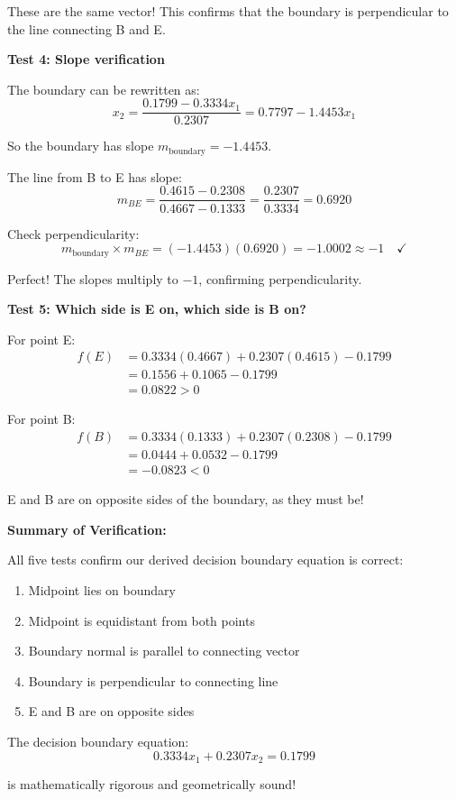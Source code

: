 \documentclass[12pt]{article}
\begin{document}
\begin{computation}
These are the same vector! This confirms that the boundary is perpendicular to the line connecting B and E. \checkmark

\textbf{Test 4: Slope verification}

The boundary can be rewritten as:
\[
x_2 = \frac{0.1799 - 0.3334 x_1}{0.2307} = 0.7797 - 1.4453 x_1
\]

So the boundary has slope \(m_{\text{boundary}} = -1.4453\).

The line from B to E has slope:
\[
m_{BE} = \frac{0.4615 - 0.2308}{0.4667 - 0.1333} = \frac{0.2307}{0.3334} = 0.6920
\]

Check perpendicularity:
\[
m_{\text{boundary}} \times m_{BE} = (-1.4453)(0.6920) = -1.0002 \approx -1 \quad \checkmark
\]

Perfect! The slopes multiply to \(-1\), confirming perpendicularity.

\textbf{Test 5: Which side is E on, which side is B on?}

For point E:
\begin{align*}
f(E) &= 0.3334(0.4667) + 0.2307(0.4615) - 0.1799 \\
&= 0.1556 + 0.1065 - 0.1799 \\
&= 0.0822 > 0
\end{align*}

For point B:
\begin{align*}
f(B) &= 0.3334(0.1333) + 0.2307(0.2308) - 0.1799 \\
&= 0.0444 + 0.0532 - 0.1799 \\
&= -0.0823 < 0
\end{align*}

E and B are on opposite sides of the boundary, as they must be! \checkmark

\textbf{Summary of Verification:}

All five tests confirm our derived decision boundary equation is correct:
\begin{enumerate}
    \item Midpoint lies on boundary \checkmark
    \item Midpoint is equidistant from both points \checkmark
    \item Boundary normal is parallel to connecting vector \checkmark
    \item Boundary is perpendicular to connecting line \checkmark
    \item E and B are on opposite sides \checkmark
\end{enumerate}

The decision boundary equation:
\[
\boxed{0.3334 x_1 + 0.2307 x_2 = 0.1799}
\]

is mathematically rigorous and geometrically sound!
\end{computation}
\end{document}
